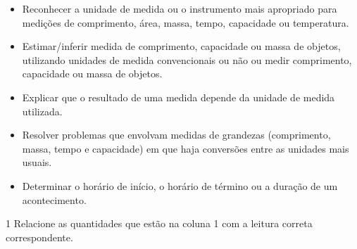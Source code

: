 \begin{itemize}
\item Reconhecer a unidade de medida ou o instrumento mais apropriado para
medições de comprimento, área, massa, tempo, capacidade ou temperatura.

\item Estimar/inferir medida de comprimento, capacidade ou massa de objetos,
utilizando unidades de medida convencionais ou não ou medir comprimento,
capacidade ou massa de objetos.

\item Explicar que o resultado de uma medida depende da unidade de medida
utilizada.

\item Resolver problemas que envolvam medidas de grandezas (comprimento,
massa, tempo e capacidade) em que haja conversões entre as unidades mais
usuais.

\item Determinar o horário de início, o horário de término ou a duração de
um acontecimento.
\end{itemize}




\num{1} Relacione as quantidades que estão na coluna 1 com a leitura
correta correspondente.

\begin{multicols}{2}







\end{multicols}



